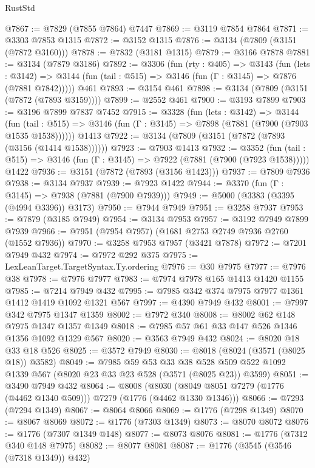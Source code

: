 \begin{lexlean}{RustStd}
\begin{coremodule}
@7867 := @7829 (@7855 @7864) @7447
@7869 := @3119 @7854 @7864
@7871 := @3303 @7853 @1315
@7872 := @3152 @1315
@7876 := @3134 (@7809 (@3151 (@7872 @3160)))
@7878 := @7832 (@3181 @1315)
@7879 := @3166 @7878
@7881 := @3134 (@7879 @3186)
@7892 := @3306
    (fun (rty : @405) =>
    @3143
      (fun (lets : @3142) =>
      @3144 (fun (tail : @515) => @3146 (fun (Γ : @3145) => @7876 (@7881 @7842)))))
    @461
@7893 := @3154 @461
@7898 := @3134 (@7809 (@3151 (@7872 (@7893 @3159))))
@7899 := @2552 @461
@7900 := @3193 @7899
@7903 := @3196 @7899 @7837 @7452
@7915 := @3328
    (fun (lets : @3142) =>
    @3144
      (fun (tail : @515) => @3146 (fun (Γ : @3145) => @7898 (@7881 (@7900 (@7903 @1535 @1538))))))
    @1413
@7922 := @3134 (@7809 (@3151 (@7872 (@7893 (@3156 (@1414 @1538))))))
@7923 := @7903 @1413
@7932 := @3352
    (fun (tail : @515) => @3146 (fun (Γ : @3145) => @7922 (@7881 (@7900 (@7923 @1538)))))
    @1422
@7936 := @3151 (@7872 (@7893 (@3156 @1423)))
@7937 := @7809 @7936
@7938 := @3134 @7937
@7939 := @7923 @1422
@7944 := @3370 (fun (Γ : @3145) => @7938 (@7881 (@7900 @7939)))
@7949 := @5000 (@3383 (@3395 (@4994 @3396)) @3173)
@7950 := @7944 @7949
@7951 := @3258 @7937
@7953 := @7879 (@3185 @7949)
@7954 := @3134 @7953
@7957 := @3192 @7949 @7899 @7939
@7966 := @7951 (@7954 @7957) (@1681 @2753 @2749 @7936 @2760 (@1552 @7936))
@7970 := @3258 @7953 @7957 (@3421 @7878)
@7972 := @7201 @7949 @432
@7974 := @7972 @292 @375
@7975 := LexLeanTarget.TargetSyntax.Ty.ordering
@7976 := @30 @7975
@7977 := @7976 @38
@7978 := @7976 @7977
@7983 := @7974 @7978 @165 @1413 @1420 @1155
@7985 := @7214 @7949 @432
@7995 := @7985 @342 @374 @7975 @7977 @1361 @1412 @1419 @1092 @1321 @567
@7997 := @4390 @7949 @432
@8001 := @7997 @342 @7975 @1347 @1359
@8002 := @7972 @340
@8008 := @8002 @62 @148 @7975 @1347 @1357 @1349
@8018 := @7985 @57 @61 @33 @147 @526 @1346 @1356 @1092 @1329 @567
@8020 := @3563 @7949 @432
@8024 := @8020 @18 @33 @18 @526
@8025 := @3572 @7949
@8030 := @8018 (@8024 (@3571 (@8025 @18)) @3582)
@8049 := @7985
    @59
    @53
    @33
    @38
    @528
    @509
    @522
    @1092
    @1339
    @567
    (@8020 @23 @33 @23 @528 (@3571 (@8025 @23)) @3599)
@8051 := @3490 @7949 @432
@8064 := @8008
    (@8030 (@8049 @8051 @7279 (@1776 (@4462 @1340 @509))) @7279 (@1776 (@4462 @1330 @1346)))
@8066 := @7293 (@7294 @1349)
@8067 := @8064 @8066
@8069 := @1776 (@7298 @1349)
@8070 := @8067 @8069
@8072 := @1776 (@7303 @1349)
@8073 := @8070 @8072
@8076 := @1776 (@7307 @1349 @148)
@8077 := @8073 @8076
@8081 := @1776 (@7312 @340 @148 @7975)
@8082 := @8077 @8081
@8087 := @1776 (@3545 (@3546 (@7318 @1349)) @432)

\end{coremodule}
\end{lexlean}
